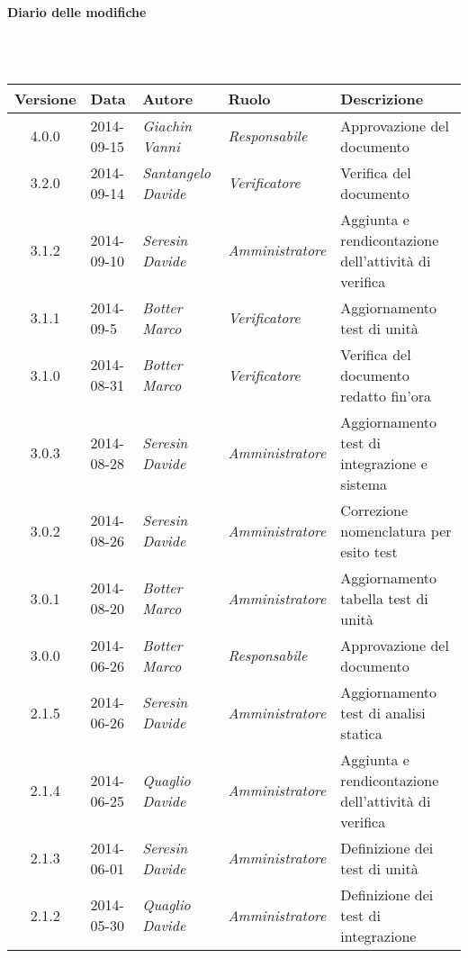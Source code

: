 \noindent\begin{Large}\textbf{Diario delle modifiche}\end{Large}\\
\\
\begin{small}
\begin{tabular}{|c|p{1.8cm}|p{2.8cm}|p{2.8cm}|p{3.5cm}|}
\hline
Versione & Data & Autore & Ruolo & Descrizione \\
\hline
\hline
4.0.0 & 2014-09-15 & 
\textit{Giachin Vanni} &
\textit{Responsabile} &  Approvazione del documento\\
\hline
3.2.0 & 2014-09-14 & 
\textit{Santangelo Davide} &
\textit{Verificatore} &  Verifica del documento\\
\hline
3.1.2 & 2014-09-10 & 
\textit{Seresin Davide} &
\textit{Amministratore} &  Aggiunta e rendicontazione dell'attività di verifica\\
\hline
3.1.1 & 2014-09-5 & 
\textit{Botter Marco} &
\textit{Verificatore} &  Aggiornamento test di unità\\
\hline
3.1.0 & 2014-08-31 & 
\textit{Botter Marco} &
\textit{Verificatore} &  Verifica del documento redatto fin'ora\\
\hline
3.0.3 & 2014-08-28 & 
\textit{Seresin Davide} &
\textit{Amministratore} &  Aggiornamento test di integrazione e sistema\\
\hline
3.0.2 & 2014-08-26 & 
\textit{Seresin Davide} &
\textit{Amministratore} &  Correzione nomenclatura per esito test\\
\hline
3.0.1 & 2014-08-20 & 
\textit{Botter Marco} &
\textit{Amministratore} &  Aggiornamento tabella test di unità\\
\hline
3.0.0 & 2014-06-26 & 
\textit{Botter Marco} &
\textit{Responsabile} &  Approvazione del documento\\
\hline
2.1.5 & 2014-06-26 & 
\textit{Seresin Davide} &
\textit{Amministratore} &  Aggiornamento test di analisi statica\\
\hline
2.1.4 & 2014-06-25 & 
\textit{Quaglio Davide} &
\textit{Amministratore} &  Aggiunta e rendicontazione dell'attività di verifica\\
\hline
2.1.3 & 2014-06-01 & 
\textit{Seresin Davide} &
\textit{Amministratore} &  Definizione dei test di unità\\
\hline
2.1.2 & 2014-05-30 & 
\textit{Quaglio Davide} &
\textit{Amministratore} &  Definizione dei test di integrazione\\

\end{tabular}
\end{small}
